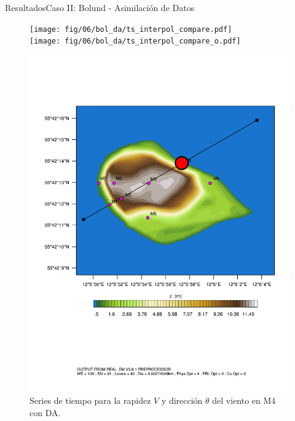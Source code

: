 \documentclass[mathserif,10pt]{beamer}
\begin{document}
\begin{frame}{Resultados}{Caso II: Bolund - Asimilación de Datos}
	\begin{figure}[H]
		\begin{minipage}{0.65\linewidth}
			\texttt{[image: fig/06/bol\_da/ts\_interpol\_compare.pdf]}\\%
			\texttt{[image: fig/06/bol\_da/ts\_interpol\_compare\_o.pdf]}%
		\end{minipage}%
		\begin{minipage}{0.35\linewidth}
			\centering
			\includegraphics[width=1\linewidth,page=1,trim={3.5cm 9.3cm 0.8cm 3.8cm},clip]{fig/05/ppt/bol_control_point4.pdf}%
		\end{minipage}%
		\vspace{-2mm}\caption{Series de tiempo para la rapidez $V$ y dirección $\theta$ del viento en M4 con DA.}
		\label{fig:06_bol_da_ts_m4}
	\end{figure}
\end{frame}
\end{document}
